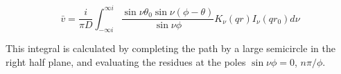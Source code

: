\documentclass{article}
\begin{document}

\begin{equation} \label{bar-v}
    \bar{v} = \frac{i}{\pi D}\int^{\infty i}_{-\infty i}
              \frac{\sin\nu\theta_0\sin\nu(\phi - \theta)}{\sin\nu\phi}
              K_\nu(qr)I_\nu(qr_0)d\nu
\end{equation}

This integral is calculated by completing the path by a large semicircle in the
 right half plane, and evaluating the residues at the poles $\sin\nu\phi = 0$, $n\pi / \phi$.
\end{document}
